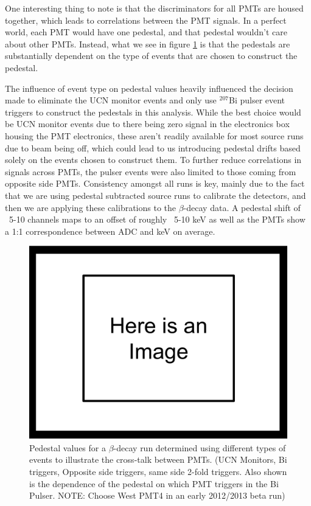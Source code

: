 One interesting thing to note is that the discriminators for all PMTs are housed 
together, which leads to correlations between the PMT signals. In a perfect world, 
each PMT would have one pedestal, and that pedestal wouldn't care about other PMTs.
Instead, what we see in figure \ref{fig:peds_types} is that the pedestals
are substantially dependent on the type of events that are chosen 
to construct the pedestal. 

The influence of event type on pedestal values heavily influenced the decision made
to eliminate the UCN monitor events and only use $^{207}$Bi pulser event 
triggers to construct the pedestals in this analysis. While the best 
choice would be UCN monitor events due to there being zero signal 
in the electronics box housing the PMT electronics, these aren't readily 
available for most source runs due to beam being off, which could lead to 
us introducing pedestal drifts based solely on the events chosen to 
construct them. To further reduce correlations in signals across PMTs, the pulser
events were also limited to those coming from opposite side PMTs.
Consistency amongst all runs 
is key, mainly due to the fact that we are using pedestal subtracted source runs
to calibrate the detectors, and then we are applying these calibrations to the 
$\beta$-decay data. A pedestal shift of ~5-10 channels maps to an offset of roughly
~5-10 keV as well as the PMTs show a 1:1 correspondence between ADC and keV on 
average. 

\begin{figure}[h] \label{fig:peds_types}
\centering
\includegraphics[scale=.25]{3-UCNAAnalysis/ImageHolder.pdf}
\caption{Pedestal values for a $\beta$-decay run determined using different 
types of events to illustrate the cross-talk between PMTs. (UCN Monitors, 
Bi triggers, Opposite side triggers, same side 2-fold triggers. Also shown 
is the dependence of the pedestal on which PMT triggers in the Bi Pulser. NOTE:
Choose West PMT4 in an early 2012/2013 beta run) }
\end{figure}

